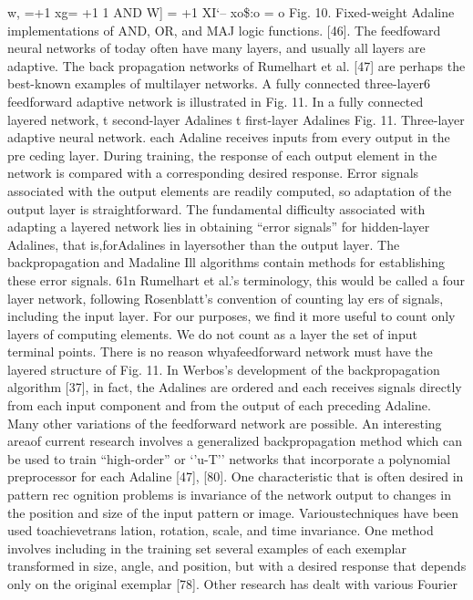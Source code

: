 \documentclass[11pt,a4paper,twocolumn]{article}
\begin{document}
w, =+1 
xg= +1 
1 
AND 
W] = +1 
XI‘-- 
xo\$:o 
= o  
Fig. 10. Fixed-weight Adaline implementations of AND, OR, 
and MAJ logic functions. 
[46]. The feedfoward neural networks of today often have 
many layers, and usually all layers are adaptive. The back
propagation networks of Rumelhart et al. [47] are perhaps 
the best-known examples of multilayer networks. A fully 
connected three-layer6 feedforward adaptive network is 
illustrated in Fig. 11. In a fully connected layered network, 
t 
second-layer 
Adalines 
t 
first-layer 
Adalines 
Fig. 11. Three-layer adaptive neural network. 
each Adaline receives inputs from every output in the pre
ceding layer. 
During training, the response of each output element in 
the network is compared with a corresponding desired 
response. Error signals associated with the output elements 
are readily computed, so adaptation of the output layer is 
straightforward. The fundamental difficulty associated with 
adapting a layered network lies in obtaining “error signals” 
for hidden-layer Adalines, that is,forAdalines in layersother 
than the output layer. The backpropagation and Madaline 
Ill algorithms contain methods for establishing these error 
signals. 
61n Rumelhart et al.’s terminology, this would be called a four
layer network, following Rosenblatt’s convention of counting lay
ers of signals, including the input layer. For our purposes, we find 
it more useful to count only layers of computing elements. We do 
not count as a layer the set of input terminal points. 
There is no reason whyafeedforward network must have 
the layered structure of Fig. 11. In Werbos’s development 
of the backpropagation algorithm [37], in fact, the Adalines 
are ordered and each receives signals directly from each 
input component and from the output of each preceding 
Adaline. Many other variations of the feedforward network 
are possible. An interesting areaof current research involves 
a generalized backpropagation method which can be used 
to train “high-order” or ‘’u-T’’ networks that incorporate 
a polynomial preprocessor for each Adaline [47], [80]. 
One characteristic that is often desired in pattern rec
ognition problems is invariance of the network output to 
changes in the position and size of the input pattern or 
image. Varioustechniques have been used toachievetrans
lation, rotation, scale, and time invariance. One method 
involves including in the training set several examples of 
each exemplar transformed in size, angle, and position, but 
with a desired response that depends only on the original 
exemplar [78]. Other research has dealt with various Fourier 
\end{document}
